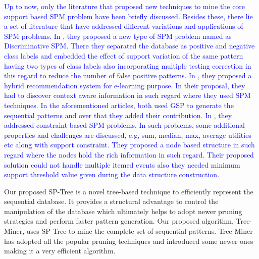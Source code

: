\textcolor{blue}{Up to now, only the literature that proposed new techniques to mine the core support based SPM problem have been briefly discussed. Besides these, there lie a set of literature that have addressed different variations and applications of SPM problems. In \cite{he2019significance}, they proposed a new type of SPM problem named as Discriminative SPM. There they separated the database as positive and negative class labels and embedded the effect of support variation of the same pattern having two types of class labels also incorporating multiple testing correction in this regard to reduce the number of false positive patterns. In \cite{tarus2018hybrid}, they proposed a hybrid recommendation system for e-learning purpose. In their proposal, they had to discover context aware information in such regard where they used SPM techniques. In the aforementioned articles, both used GSP to generate the sequential patterns and over that they added their contribution. In \cite{hosseininasab2019constraint}, they addressed constraint-based SPM problems. In such problems, some additional properties and challenges are discussed, e.g, sum, median, max, average utilities etc along with support constraint. They proposed a node based structure in such regard where the nodes hold the rich information in such regard. Their proposed solution could not handle multiple itemed events also they needed minimum support threshold value given during the data structure construction.}


Our proposed SP-Tree is a novel tree-based technique to efficiently represent the sequential database. It provides a structural advantage to control the manipulation of the database which ultimately helps to adopt newer pruning strategies and perform faster pattern generation. Our proposed algorithm, Tree-Miner, uses SP-Tree to mine the complete set of sequential patterns. Tree-Miner has adopted all the popular pruning techniques and introduced some newer ones making it a very efficient algorithm.


